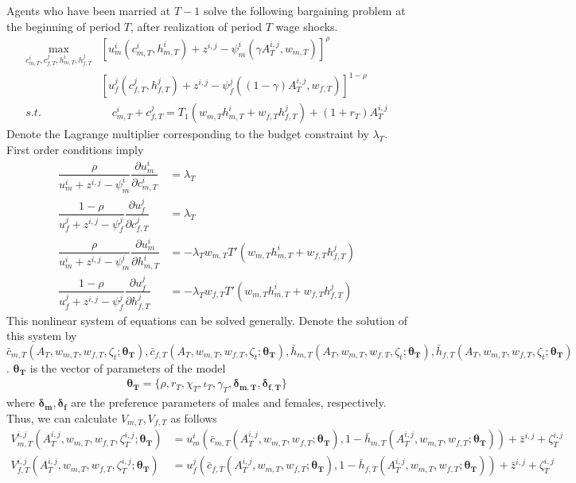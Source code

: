 Agents who have been married at $T-1$ solve the following bargaining problem at the beginning of period $T$, after realization of period $T$ wage shocks. 
\begin{align*}
\max_{c^i_{m,T}, c^j_{f,T}, h^i_{m,T}, h^j_{f,T}} &\left [ u_m^{i} (c^i_{m,T}, h^i_{m,T}) + z^{i,j} - \psi_m^i(\gamma A^{i,j}_T, w_{m,T})\right ]^{\rho} \\
& \left [ u_f^{j} (c^j_{f,T}, h^j_{f,T}) + z^{i,j} - \psi_f^j((1 -\gamma) A^{i,j}_T, w_{f,T})\right ]^{1-\rho} \\
s.t.  &\quad c^i_{m,T} + c^j_{f,T} = T_1(w_{m,T} h^i _{m,T} + w_{f,T} h^j_{f,T}) + (1+r_T)A^{i,j}_T
\end{align*}
Denote the Lagrange multiplier corresponding to the budget constraint by $\lambda_T$. First order conditions imply 
\begin{align}
\dfrac{\rho}{u_m^i + z^{i,j} - \psi_m^i} \dfrac{\partial u_m^i}{\partial c^i_{m,T}} &= \lambda_T  \label{foc_1} \\
\dfrac{1 - \rho}{u_f^j+ z^{i,j}- \psi_f^j} \dfrac{\partial u_f^j}{\partial c^j_{f,T}} &= \lambda_T \label{foc_2}\\
\dfrac{\rho}{u_m^i+ z^{i,j} - \psi_m^i} \dfrac{\partial u_m^i}{\partial h^i_{m,T}} &= -\lambda_T w_{m,T} T'(w_{m,T} h^i _{m,T} + w_{f,T} h^j_{f,T}) \\
\dfrac{1 - \rho}{u_f^j+ z^{i,j}- \psi_f^j} \dfrac{\partial u_f^j}{\partial h^j_{f,T}} &= -\lambda_T w_{f,T} T'(w_{m,T} h^i _{m,T} + w_{f,T} h^j_{f,T}) 
\end{align}
This nonlinear system of equations can be solved generally. Denote the solution of this system by $\bar c_{m,T}(A_T, w_{m,T}, w_{f,T}, \zeta_t; \bm{\theta_T}), \bar c_{f,T}(A_T, w_{m,T}, w_{f,T}, \zeta_t; \bm{\theta_T}), \bar h_{m,T}(A_T, w_{m,T}, w_{f,T}, \zeta_t; \bm{\theta_T}), \bar h_{f,T}(A_T, w_{m,T}, w_{f,T}, \zeta_t; \bm{\theta_T})$.  $\bm{\theta_T}$ is the vector of parameters of the model 
\begin{align*}
\bm{\theta_T} = \{\rho, r_T, \chi_T, \iota_T, \gamma_T, \bm{\delta_{m,T}, \delta_{f,T}}\}
\end{align*}
where $\bm{\delta_m, \delta_f}$ are the preference parameters of males and females, respectively. Thus, we can calculate $V_{m,T}, V_{f,T}$ as follows 
\begin{align*}
V^{i,j}_{m,T} (A^{i,j}_T, w_{m,T}, w_{f,T}, \zeta^{i,j}_T; \bm{\theta_T}) &= u_m^i\left (\bar c_{m,T}(A^{i,j}_T, w_{m,T}, w_{f,T}; \bm{\theta_T}), 1 - \bar h_{m,T}(A^{i,j}_T, w_{m,T}, w_{f,T}; \bm{\theta_T})\right ) + \bar z^{i,j} +\zeta_T^{i,j} \\
V^{i,j}_{f,T} (A^{i,j}_T, w_{m,T}, w_{f,T}, \zeta^{i,j}_T; \bm{\theta_T}) &= u^j_f\left (\bar c_{f,T}(A^{i,j}_T, w_{m,T}, w_{f,T}; \bm{\theta_T}), 1 - \bar h_{f,T}(A^{i,j}_T, w_{m,T}, w_{f,T}; \bm{\theta_T})\right ) + \bar z^{i,j} +\zeta_T^{i,j} 
\end{align*}

